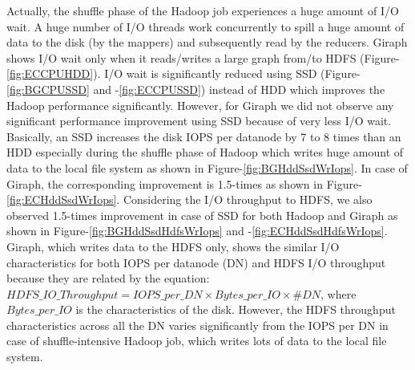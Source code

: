 \documentclass[conference]{IEEEtran}
\begin{document}
Actually, the shuffle phase of the Hadoop job experiences a huge amount of  I/O wait. A huge number of I/O threads work concurrently to spill a huge amount of data to the disk (by the mappers) and subsequently read by the reducers. %
Giraph shows I/O wait only when it reads/writes a large graph from/to HDFS (Figure-\ref{fig:ECCPUHDD}).
I/O wait is significantly reduced using SSD (Figure-\ref{fig:BGCPUSSD} and -\ref{fig:ECCPUSSD}) instead of HDD which improves the Hadoop performance significantly. 
However, for Giraph we did not observe any significant performance improvement using SSD because of very less I/O wait. Basically, an SSD increases the disk IOPS per datanode by 7 to 8 times than an HDD especially during the shuffle phase of Hadoop which writes huge amount of data  to  the local file system as shown in Figure-\ref{fig:BGHddSsdWrIops}.
In case of Giraph, the corresponding improvement is 1.5-times as shown in Figure-\ref{fig:ECHddSsdWrIops}.
Considering the I/O throughput to HDFS, we also observed 1.5-times improvement in case of SSD for both Hadoop and Giraph as shown in Figure-\ref{fig:BGHddSsdHdfsWrIops} and -\ref{fig:ECHddSsdHdfsWrIops}.
Giraph, which writes data to the HDFS only, shows the similar I/O characteristics  for both IOPS per datanode (DN) and HDFS I/O throughput because they are related by the equation: $HDFS\_IO\_Throughput = IOPS\_per\_DN \times Bytes\_per\_IO \times \#DN$, where $Bytes\_per\_IO$ is the characteristics of the disk.  However, the HDFS throughput characteristics across all the DN varies significantly from the IOPS per DN in case of shuffle-intensive Hadoop job, which writes lots of data to the local file system. 
\end{document}
